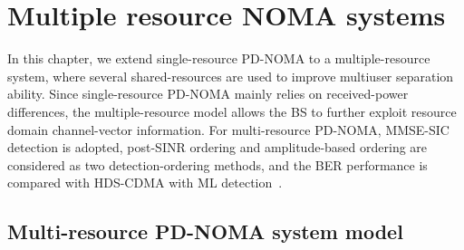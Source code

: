
\chapter{Multiple resource NOMA systems}
\label{ch:multi-resource}
In this chapter, we extend single-resource PD-NOMA to a multiple-resource system, where several shared-resources are used to improve multiuser separation ability. 
Since single-resource PD-NOMA mainly relies on received-power differences, the multiple-resource model allows the BS to further exploit resource domain channel-vector information. 
For multi-resource PD-NOMA, MMSE-SIC detection is adopted, post-SINR ordering and amplitude-based ordering are considered as two detection-ordering methods, and the BER performance is compared with HDS-CDMA with ML detection~\cite{lin2023gdma}.

\section{Multi-resource PD-NOMA system model}

